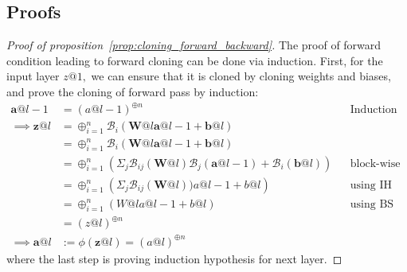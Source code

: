 \documentclass{article}
\newcommand{\1}{\mathbf{1}}
\newcommand{\R}[2]{\mathcal{R}_{#2}(#1)}
\renewcommand{\R}[2]{({#1})^{\oplus #2}}
\newcommand{\bl}[2]{\mathcal{B}_{#2}({#1})}
\newcommand{\B}[1]{\boldsymbol{#1}}
\begin{document}
\subsection{Proofs}

\begin{proof}[Proof of proposition~\ref{prop:cloning_forward_backward}]
    The proof of forward condition leading to forward cloning can be done via induction. First, for the input layer $z@1,$ we can ensure that it is cloned by cloning weights and biases, and prove the cloning of forward pass by induction:
    \begin{align*}
        \B a@{l-1} &= \R{a@{l-1}}{n} && \text{Induction hypothesis (IH)} \\
      \implies  \B z@l &= \oplus_{i=1}^n \bl{\B W@l \B a@{l-1} + \B b@l}{i} \\
      &= \oplus_{i=1}^n \bl{\B W@l \B a@{l-1} + \B b@l}{i} \\
      &= \oplus_{i=1}^n \left(\Sigma_{j} \bl{\B W @l}{ij}\bl{\B a@{l-1}}{j} + \bl{\B b@l}{i}\right)&& \text{block-wise product}\\
      &= \oplus_{i=1}^n \left(\Sigma_j \bl{\B W @l}{ij}) a@{l-1} + b@l\right) && \text{using IH} \\
      &= \oplus_{i=1}^n \left(W@l a@{l-1} + b@l \right) &&\text{using BS} \\
      &= \R{z@l}{n} \\
  \implies \B a@l&:=\phi(\B z@l) = \R{a@l}{n}   
    \end{align*}
    where the last step is proving induction hypothesis for next layer. 


\end{proof}
\end{document}
